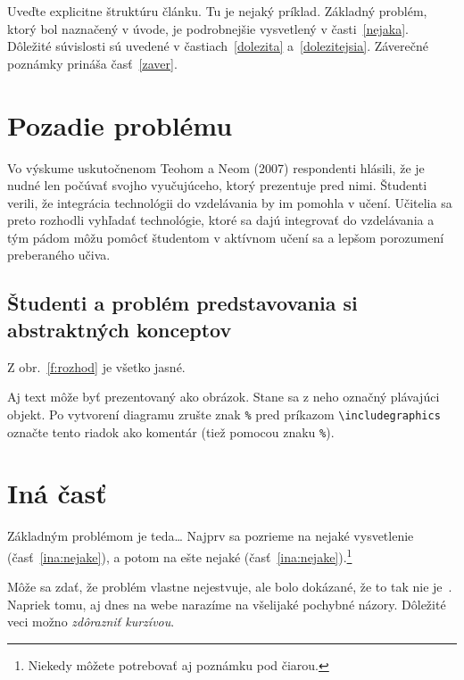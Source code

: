 \documentclass[10pt,twoside,slovak,a4paper]{article}
\begin{document}
Uveďte explicitne štruktúru článku. Tu je nejaký príklad.
Základný problém, ktorý bol naznačený v úvode, je podrobnejšie vysvetlený v časti~\ref{nejaka}.
Dôležité súvislosti sú uvedené v častiach~\ref{dolezita} a~\ref{dolezitejsia}.
Záverečné poznámky prináša časť~\ref{zaver}.



\section{Pozadie problému} \label{rozsirenaRealita}
Vo výskume uskutočnenom Teohom a Neom (2007) respondenti hlásili, že je nudné len počúvať svojho vyučujúceho, ktorý prezentuje pred nimi.
Študenti verili, že integrácia technológii do vzdelávania by im pomohla v učení. 
Učitelia sa preto rozhodli vyhľadať technológie, ktoré sa dajú integrovať do vzdelávania a tým pádom môžu pomôcť študentom v aktívnom učení sa a lepšom porozumení preberaného učiva.\cite{Saidin2015}
\subsection{Študenti a problém predstavovania si abstraktných konceptov} \label{rozsirenaRealita:abstraktneKoncepty}

Z obr.~\ref{f:rozhod} je všetko jasné. 

\begin{figure*}[tbh]
\centering
Aj text môže byť prezentovaný ako obrázok. Stane sa z neho označný plávajúci objekt. Po vytvorení diagramu zrušte znak \texttt{\%} pred príkazom \verb|\includegraphics| označte tento riadok ako komentár (tiež pomocou znaku \texttt{\%}).
\caption{Rozhodujúci argument.}
\label{f:rozhod}
\end{figure*}



\section{Iná časť} \label{ina}

Základným problémom je teda\ldots{} Najprv sa pozrieme na nejaké vysvetlenie (časť~\ref{ina:nejake}), a potom na ešte nejaké (časť~\ref{ina:nejake}).\footnote{Niekedy môžete potrebovať aj poznámku pod čiarou.}

Môže sa zdať, že problém vlastne nejestvuje\cite{Coplien:MPD}, ale bolo dokázané, že to tak nie je~\cite{Czarnecki:Staged, Czarnecki:Progress}. Napriek tomu, aj dnes na webe narazíme na všelijaké pochybné názory\cite{PLP-Framework}. Dôležité veci možno \emph{zdôrazniť kurzívou}.
\end{document}
